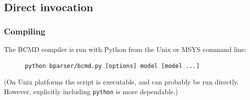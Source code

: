 \documentclass[a4paper,11pt]{article}
\begin{document}
%
%

\subsection{Direct invocation}\label{direct}

\subsubsection{Compiling}\label{compile}

The BCMD compiler is run with Python from the Unix or MSYS command line:
\begin{verbatim}
      python bparser/bcmd.py [options] model [model ...]
\end{verbatim}
(On Unix platforms the script is executable, and can probably be run directly. However, explicitly including \texttt{python} is more dependable.)
\end{document}
